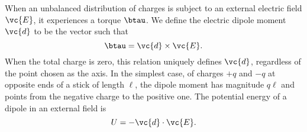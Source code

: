 When an unbalanced distribution of charges is subject to an external
electric field $\vc{E}$, it experiences a torque $\btau$. We define the electric dipole
moment $\vc{d}$ to be the vector such that
\begin{equation}
  \btau=\vc{d}\times\vc{E}.
\end{equation}
When the total charge is zero, this relation uniquely defines $\vc{d}$, regardless of
the point chosen as the axis.
In the simplest case, of charges $+q$ and $-q$ at opposite ends of a stick of
length $\ell$, the dipole moment has magnitude $q\ell$ and points from the negative
charge to the positive one.
The potential energy of a dipole in an external field is
\begin{equation}
  U = -\vc{d}\cdot\vc{E}.
\end{equation}
